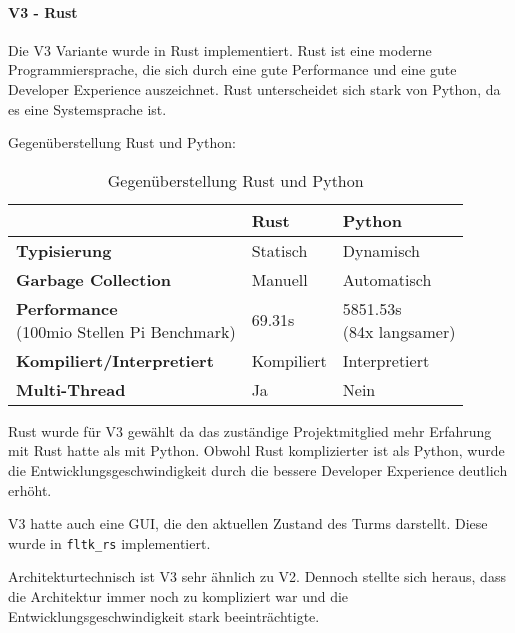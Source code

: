 \paragraph{V3 - Rust}
Die V3 Variante wurde in Rust implementiert. Rust ist eine moderne Programmiersprache, die sich durch eine gute Performance und eine gute Developer Experience auszeichnet. Rust unterscheidet sich stark von Python, da es eine Systemsprache ist.

Gegenüberstellung Rust und Python:
\begin{table}[H]
  \begin{tabular}{l|l|l}
                                      & \textbf{Rust} & \textbf{Python}       \\
    \hline
    \textbf{Typisierung}              & Statisch      & Dynamisch             \\
    \textbf{Garbage Collection}       & Manuell       & Automatisch           \\
    \makecell[l]{\textbf{Performance }                                        \\(100mio Stellen Pi Benchmark\cite{programming_language_speeds})}
                                      & 69.31s        & \makecell[l]{5851.53s \\(84x langsamer)} \\
    \textbf{Kompiliert/Interpretiert} & Kompiliert    & Interpretiert         \\
    \textbf{Multi-Thread}             & Ja            & Nein                  \\
  \end{tabular}
  \caption{Gegenüberstellung Rust und Python}
  \label{tab:rust_vs_python}
\end{table}

Rust wurde für V3 gewählt da das zuständige Projektmitglied mehr Erfahrung mit Rust hatte als mit Python. Obwohl Rust komplizierter ist als Python, wurde die Entwicklungsgeschwindigkeit durch die bessere Developer Experience deutlich erhöht.

V3 hatte auch eine \ac{GUI}, die den aktuellen Zustand des Turms darstellt. Diese wurde in \texttt{fltk\_rs} implementiert.

Architekturtechnisch ist V3 sehr ähnlich zu V2. Dennoch stellte sich heraus, dass die Architektur immer noch zu kompliziert war und die Entwicklungsgeschwindigkeit stark beeinträchtigte.
